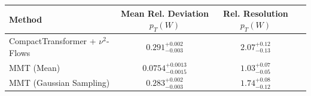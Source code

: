     \begin{tabular}{lccc}
        \toprule
        Method & Mean Rel. Deviation $p_{T}(W)$ & Rel. Resolution $p_{T}(W)$ \\
        \midrule
        CompactTransformer + $\nu^2$-Flows & $0.291^{+0.002}_{-0.003}$ & $2.07^{+0.12}_{-0.13}$ \\
        MMT (Mean) & $0.0754^{+0.0013}_{-0.0015}$ & $1.03^{+0.07}_{-0.05}$ \\
        MMT (Gaussian Sampling) & $0.283^{+0.002}_{-0.003}$ & $1.74^{+0.08}_{-0.12}$ \\
        \bottomrule
    \end{tabular}